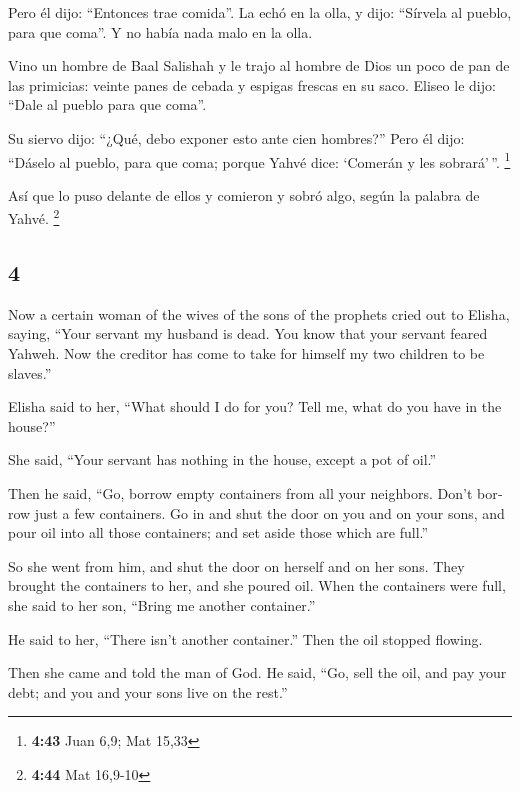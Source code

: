 \begin{paracol}{2}
 Pero él dijo: ``Entonces trae comida''. La echó en la
olla, y dijo: ``Sírvela al pueblo, para que coma''. Y no había nada malo
en la olla.

 Vino un hombre de Baal Salishah y le trajo al hombre de
Dios un poco de pan de las primicias: veinte panes de cebada y espigas
frescas en su saco. Eliseo le dijo: ``Dale al pueblo para que coma''.

 Su siervo dijo: ``¿Qué, debo exponer esto ante cien
hombres?'' Pero él dijo: ``Dáselo al pueblo, para que coma; porque Yahvé
dice: `Comerán y les sobrará'\,''. \footnote{\textbf{4:43} Juan 6,9; Mat
  15,33}

 Así que lo puso delante de ellos y comieron y sobró
algo, según la palabra de Yahvé. \footnote{\textbf{4:44} Mat 16,9-10}

\switchcolumn
\begin{otherlanguage}{english}

\hypertarget{section-7}{%
\section{4}\label{section-7}}

 Now a certain woman of the wives of the sons of the
prophets cried out to Elisha, saying, ``Your servant my husband is dead.
You know that your servant feared Yahweh. Now the creditor has come to
take for himself my two children to be slaves.''

 Elisha said to her, ``What should I do for you? Tell me,
what do you have in the house?''

She said, ``Your servant has nothing in the house, except a pot of
oil.''

 Then he said, ``Go, borrow empty containers from all your
neighbors. Don't borrow just a few containers.  Go in and
shut the door on you and on your sons, and pour oil into all those
containers; and set aside those which are full.''

 So she went from him, and shut the door on herself and on
her sons. They brought the containers to her, and she poured oil.
 When the containers were full, she said to her son,
``Bring me another container.''

He said to her, ``There isn't another container.'' Then the oil stopped
flowing.

 Then she came and told the man of God. He said, ``Go,
sell the oil, and pay your debt; and you and your sons live on the
rest.''


\end{otherlanguage}
\end{paracol}
